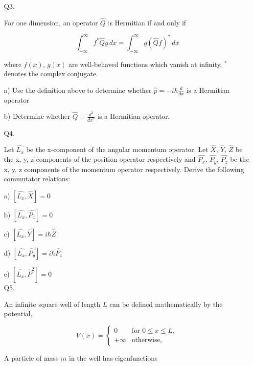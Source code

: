 \documentclass[a4paper,11pt]{article}
\begin{document}
Q3.

For one dimension, an operator \( \hat{Q} \) is Hermitian if and only if 

\[ \int_{-\infty}^{\infty} f^{*}\hat{Q}g \, dx = \int_{-\infty}^{\infty} g(\hat{Q}f)^{*} \, dx \]

where \( f(x) \), \( g(x) \) are well-behaved functions which vanish at infinity, \( ^{*} \) denotes the complex conjugate. 

\medskip

a) Use the definition above to determine whether \( \hat{p} = -i\hbar\frac{d}{dx} \) is a Hermitian operator 

\medskip

b) Determine whether \( \hat{Q} = \frac{d^{2}}{dx^{2}} \) is a Hermitian operator.

\bigskip

Q4. 

Let \( \hat{L_{x}} \) be the x-component of the angular momentum operator. Let \( \hat{X} \), \( \hat{Y} \), \( \hat{Z} \) be the x, y, z components of the position operator respectively and \( \hat{P_{x}} \), \( \hat{P_{y}} \), \( \hat{P_{z}} \)  be the x, y, z components of the momentum operator respectively. Derive the following commutator relations:

\medskip

a) \( \left[ \hat{L_{x}}, \hat{X} \right] = 0 \)

\medskip

b) \( \left[ \hat{L_{x}}, \hat{P_{x}} \right] = 0 \)

\medskip

c) \( \left[ \hat{L_{x}}, \hat{Y} \right] = i \hbar \hat{Z} \)

\medskip

d) \( \left[ \hat{L_{x}}, \hat{P_{y}} \right] = i \hbar \hat{P_{z}} \)

\medskip

e) \( \left[ \hat{L_{x}}, \hat{P}^{2} \right] = 0 \) \\

Q5. 

An infinite square well of length \( L \) can be defined mathematically by the potential,

\[ V(x) = \begin{cases}
0 & \text{for } 0 \leq x \leq L,\\
+\infty  & \text{otherwise,} 
\end{cases} \]

A particle of mass \( m \) in the well has eigenfunctions
\end{document}
